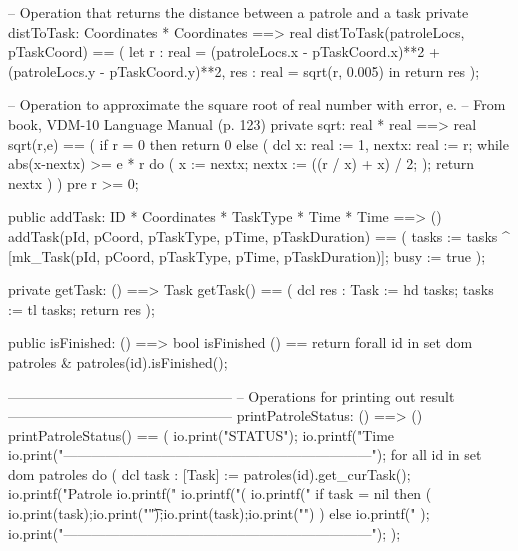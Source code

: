 \documentclass[a4paper]{article}
\begin{document}
\begin{vdm_al}
    -- Operation that returns the distance between a patrole and a task
    private distToTask: Coordinates * Coordinates ==> real
    distToTask(patroleLocs, pTaskCoord) ==
        (
            let
                r : real = (patroleLocs.x - pTaskCoord.x)**2 + (patroleLocs.y - pTaskCoord.y)**2,
                res : real = sqrt(r, 0.005) 
            in
                return res
        );

    -- Operation to approximate the square root of real number with error, e.
    -- From book, VDM-10 Language Manual (p. 123) 
    private sqrt: real * real ==> real
    sqrt(r,e) ==
        (
            if r = 0
            then return 0
            else 
            (
                dcl x: real := 1,
                nextx: real := r;
                while abs(x-nextx) >= e * r  do
                    (
                        x := nextx;
                        nextx := ((r / x) + x) / 2;
                    );
                return nextx
            )
        )
    pre r >= 0;

    public addTask: ID * Coordinates * TaskType * Time * Time ==> ()
    addTask(pId, pCoord, pTaskType, pTime, pTaskDuration) ==
        (
            tasks := tasks ^ [mk_Task(pId, pCoord, pTaskType, pTime, pTaskDuration)];
            busy := true
        );
    
    private getTask: () ==> Task
    getTask() ==
        (
            dcl res : Task := hd tasks;
            tasks := tl tasks;
            return res
        );

    public isFinished: () ==> bool
    isFinished () ==
        return forall id in set dom patroles &
            patroles(id).isFinished();

------------------------------------------------
-- Operations for printing out result
------------------------------------------------
    printPatroleStatus: () ==> ()
    printPatroleStatus() ==
    (
        io.print("STATUS\n");     
        io.printf("Time  %
        io.print("------------------------------------------------------------------\n");
        for all id in set dom patroles do
        (
            dcl task : [Task] := patroles(id).get_curTask();
            io.printf("Patrole %
            io.printf("%
            io.printf("(%
            io.printf("%
            if task = nil
            then 
            (    
                io.print(task);io.print("\t");io.print(task);io.print("\n")
            )
            else io.printf("%
        );
        io.print("------------------------------------------------------------------\n\n");
    );


\end{vdm_al}
\end{document}
